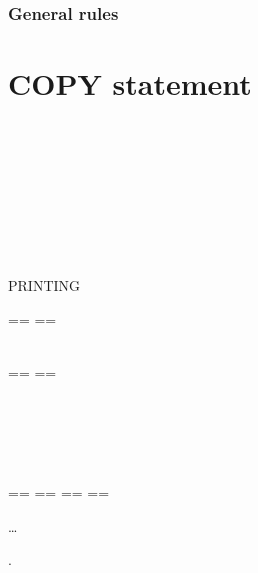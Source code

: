 \subsubsection{General rules}

\section{COPY statement}

\begin{syntax}
  \begin{1=}
     \\
  \end{1=}
  \begin{1=}
    \literal \\
    \textname \\
  \end{1=}
  \begin{0-1}
    \begin{1=}
       \\
    \end{1=}
    \begin{1=}
      \literal \\
      \libraryname
    \end{1=}
  \end{0-1}

  \begin{0-1}
     PRINTING
  \end{0-1}

  \begin{0-1}
    \begin{1=}
      \begin{1=}
        == \pseudotext == \\
        \identifier \\
        \literal
      \end{1=}
      \begin{1=}
        == \pseudotext == \\
        \identifier \\
        \literal
      \end{1=} \\

      \begin{1=}
         \\
      \end{1=}
      ==  ==
      ==  ==
    \end{1=}\ldots
  \end{0-1}
  .
\end{syntax}


